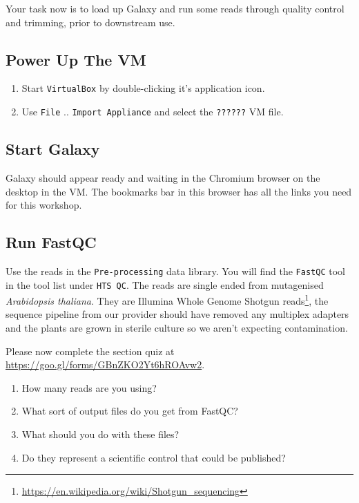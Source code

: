 \documentclass[12pt,]{book}
\providecommand{\tightlist}{%
  \setlength{\itemsep}{0pt}\setlength{\parskip}{0pt}}
\let\rmarkdownfootnote\footnote%
\def\footnote{\protect\rmarkdownfootnote}
\renewcommand{\href}[2]{#2\footnote{\url{#1}}}
\begin{document}
Your task now is to load up Galaxy and run some reads through quality
control and trimming, prior to downstream use.

\subsection{Power Up The VM}\label{power-up-the-vm}

\begin{enumerate}
\def\labelenumi{\arabic{enumi}.}
\tightlist
\item
  Start \texttt{VirtualBox} by double-clicking it's application icon.
\item
  Use \texttt{File} .. \texttt{Import\ Appliance} and select the
  \texttt{??????} VM file.
\end{enumerate}

\subsection{Start Galaxy}\label{start-galaxy}

Galaxy should appear ready and waiting in the Chromium browser on the
desktop in the VM. The bookmarks bar in this browser has all the links
you need for this workshop.

\subsection{Run FastQC}\label{run-fastqc}

Use the reads in the \texttt{Pre-processing} data library. You will find
the \texttt{FastQC} tool in the tool list under \texttt{HTS\ QC}. The
reads are single ended from mutagenised \emph{Arabidopsis thaliana}.
They are Illumina
\href{https://en.wikipedia.org/wiki/Shotgun_sequencing}{Whole Genome
Shotgun reads}, the sequence pipeline from our provider should have
removed any multiplex adapters and the plants are grown in sterile
culture so we aren't expecting contamination.

Please now complete the section quiz at
\url{https://goo.gl/forms/GBnZKO2Yt6hROAvw2}.

\begin{enumerate}
\def\labelenumi{\arabic{enumi}.}
\tightlist
\item
  How many reads are you using?
\item
  What sort of output files do you get from FastQC?
\item
  What should you do with these files?
\item
  Do they represent a scientific control that could be published?
\end{enumerate}
\end{document}
